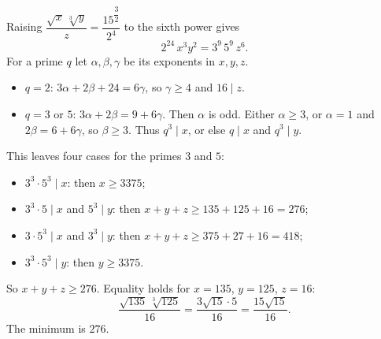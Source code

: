 Raising $\dfrac{\sqrt x\,\sqrt[3]y}{z}=\dfrac{15^{\dfrac32}}{2^4}$ to the sixth power gives
\[2^{24}\,x^3y^2=3^9\,5^9\,z^6.\]
For a prime $q$ let $\alpha,\beta,\gamma$ be its exponents in $x,y,z$.
\begin{itemize}
\item $q=2$: $3\alpha+2\beta+24=6\gamma$, so $\gamma\ge4$ and $16\mid z$.
\item $q=3$ or $5$: $3\alpha+2\beta=9+6\gamma$. Then $\alpha$ is odd. Either $\alpha\ge3$, or $\alpha=1$ and $2\beta=6+6\gamma$, so $\beta\ge3$. Thus $q^3\mid x$, or else $q\mid x$ and $q^3\mid y$.
\end{itemize}
This leaves four cases for the primes $3$ and $5$:
\begin{itemize}
\item $3^3\cdot5^3\mid x$: then $x\ge3375$;
\item $3^3\cdot5\mid x$ and $5^3\mid y$: then $x+y+z\ge135+125+16=276$;
\item $3\cdot5^3\mid x$ and $3^3\mid y$: then $x+y+z\ge375+27+16=418$;
\item $3^3\cdot5^3\mid y$: then $y\ge3375$.
\end{itemize}
So $x+y+z\ge276$. Equality holds for $x=135$, $y=125$, $z=16$:
\[\dfrac{\sqrt{135}\,\sqrt[3]{125}}{16}=\dfrac{3\sqrt{15}\cdot5}{16}=\dfrac{15\sqrt{15}}{16}.\]
The minimum is $\boxed{276}$.
